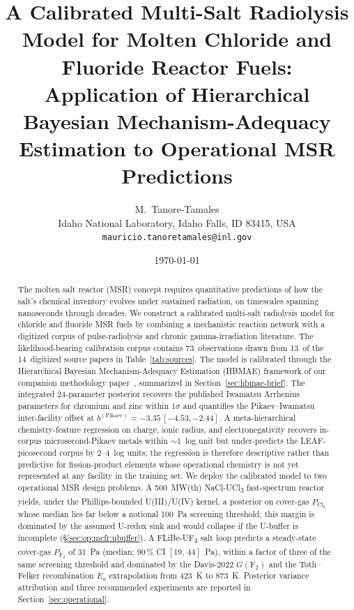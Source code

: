 \documentclass[11pt]{article}
\title{\bfseries A Calibrated Multi-Salt Radiolysis Model for Molten Chloride
       and Fluoride Reactor Fuels:\\
       Application of Hierarchical Bayesian Mechanism-Adequacy Estimation
       to Operational MSR Predictions}
\author{M.\ Tanore-Tamales \\
        \small Idaho National Laboratory, Idaho Falls, ID 83415, USA \\
        \small \texttt{mauricio.tanoretamales@inl.gov}}
\date{\today}
\theoremstyle{plain}
\theoremstyle{definition}
\theoremstyle{remark}
\newcommand{\HBMAE}{HBMAE\xspace}
\newcommand{\Ea}{E_a}
\begin{document}
\maketitle

\begin{abstract}
\noindent
The molten salt reactor (MSR) concept requires quantitative predictions of
how the salt's chemical inventory evolves under sustained radiation, on
timescales spanning nanoseconds through decades.  We construct a
calibrated multi-salt radiolysis model for chloride and fluoride MSR
fuels by combining a mechanistic reaction network with a digitized corpus
of pulse-radiolysis and chronic gamma-irradiation literature.  The
likelihood-bearing calibration corpus contains 73~observations drawn from
13~of the 14~digitized source papers in Table~\ref{tab:sources}.  The
model is calibrated through the Hierarchical Bayesian Mechanism-Adequacy
Estimation (\HBMAE) framework of our companion methodology
paper~\citep{Tanore2026PaperI}, summarized in
Section~\ref{sec:hbmae-brief}.  The integrated 24-parameter posterior
recovers the published Iwamatsu Arrhenius parameters for chromium and
zinc within $1\sigma$ and quantifies the Pikaev--Iwamatsu inter-facility
offset at $b^{(\mathrm{Pikaev})} = -3.35\,[-4.53,-2.44]$.  A
meta-hierarchical chemistry-feature regression on charge, ionic radius,
and electronegativity recovers in-corpus microsecond-Pikaev metals within
$\sim$1~log unit but under-predicts the LEAF-picosecond corpus by
2--4~log units; the regression is therefore descriptive rather than
predictive for fission-product elements whose operational chemistry is
not yet represented at any facility in the training set.
We deploy the calibrated model to two operational MSR design problems.
A 500~MW(th) NaCl-UCl\textsubscript{3} fast-spectrum reactor yields,
under the Phillips-bounded U(III)/U(IV) kernel, a posterior on cover-gas
$P_{\mathrm{Cl}_2}$ whose median lies far below a notional 100~Pa
screening threshold; this margin is dominated by the assumed U-redox
sink and would collapse if the U-buffer is incomplete
(\S\ref{sec:op:mcfr:ubuffer}).  A FLiBe-UF\textsubscript{4} salt loop
predicts a steady-state cover-gas $P_{\mathrm{F}_2}$ of 31~Pa (median;
90\,\% CI $[19,\,44]$~Pa), within a factor of three of the same screening
threshold and dominated by the Davis-2022 $G(\mathrm{F}_2)$ and the
Toth--Felker recombination $\Ea$ extrapolation from 423~K to 873~K.
Posterior variance attribution and three recommended experiments are
reported in Section~\ref{sec:operational}.
\end{abstract}
\end{document}
